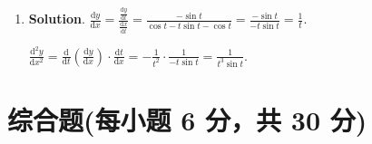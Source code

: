 \documentclass[../Main.tex]{subfiles}
\begin{document}
\begin{enumerate}
          代入$x=\frac{\pi}{2}$得$y^{(5)}\left(\frac{\pi}{2}\right)=-80\pi$.

    \item \textbf{Solution}. $\frac{\mathrm{d}y}{\mathrm{d}x}=\frac{\frac{\mathrm{d}y}{\mathrm{d}t}}{\frac{\mathrm{d}x}{\mathrm{d}t}}
              =\frac{-\sin t}{\cos t-t\sin t-\cos t}=\frac{-\sin t}{-t\sin t}=\frac{1}{t}$.

          $\frac{\mathrm{d}^{2}y}{\mathrm{d}x^{2}}=\frac{\mathrm{d}}{\mathrm{d}t}\left
              (\frac{\mathrm{d}y}{\mathrm{d}x}\right)\cdot\frac{\mathrm{d}t}{\mathrm{d}x}
              =-\frac{1}{t^{2}}\cdot\frac{1}{-t\sin t}=\frac{1}{t^{3}\sin t}$.
\end{enumerate}

\section{综合题(每小题 6 分，共 30 分)}
\end{document}
